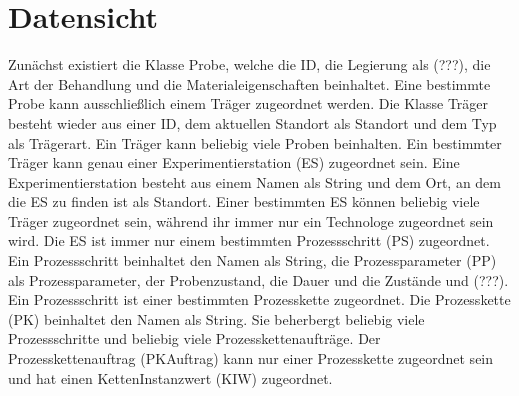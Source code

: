 \documentclass[enabledeprecatedfontcommands,fontsize=12pt,paper=a4,twoside]{scrartcl}
\begin{document}
\section{Datensicht}
\label{sec:datensicht}

{ Zunächst existiert die Klasse Probe, welche die ID, die Legierung als (???), die Art der Behandlung und die Materialeigenschaften beinhaltet. Eine bestimmte Probe kann ausschließlich einem Träger zugeordnet werden. 
Die Klasse Träger besteht wieder aus einer ID, dem aktuellen Standort als  Standort und dem Typ als Trägerart. Ein Träger kann beliebig viele Proben beinhalten. Ein bestimmter Träger kann genau einer Experimentierstation (ES) zugeordnet sein. Eine Experimentierstation besteht aus einem Namen als String und dem Ort, an dem die ES zu finden ist als Standort. Einer bestimmten ES können beliebig viele Träger zugeordnet sein, während ihr immer nur ein  Technologe zugeordnet sein wird. Die ES ist immer nur einem bestimmten Prozessschritt (PS) zugeordnet. Ein Prozessschritt beinhaltet den Namen als String, die Prozessparameter (PP) als Prozessparameter, der Probenzustand, die Dauer und die Zustände und (???). Ein Prozessschritt ist einer bestimmten Prozesskette zugeordnet. Die Prozesskette (PK) beinhaltet den Namen als String. Sie beherbergt beliebig viele Prozessschritte und beliebig viele Prozesskettenaufträge. Der  Prozesskettenauftrag (PKAuftrag) kann nur einer Prozesskette zugeordnet sein und hat einen KettenInstanzwert (KIW) zugeordnet. \\}
\end{document}
